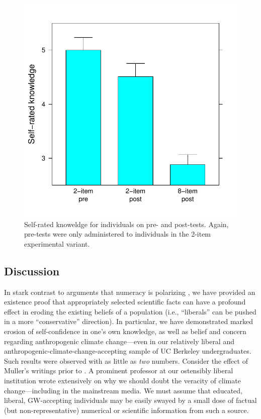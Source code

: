 \begin{figure}
    \centering
    \includegraphics{evil-know.pdf}
    \caption{Self-rated knoweldge for individuals on pre- and post-tests. Again,
        pre-tests were only administered to individuals in the 2-item
        experimental variant.}
    \label{fig:evil-know}
\end{figure}

\subsection{Discussion}

In stark contrast to arguments that numeracy is polarizing
\parencite{kahan_polarizing_2012}, we have provided an existence proof that
appropriately selected scientific facts can have a profound effect in eroding
the existing beliefs of a population (i.e., “liberals” can be pushed in a more
“conservative” direction). In particular, we have demonstrated marked erosion of
self-confidence in one's own knowledge, as well as belief and concern regarding
anthropogenic climate change---even in our relatively liberal and
anthropogenic-climate-change-accepting sample of UC Berkeley undergraduates.
Such results were observed with as little as \emph{two} numbers.
Consider the effect of Muller's writings prior to \textcite{rohde_new_2013}. A
prominent professor at our ostensibly liberal institution wrote extensively on
why we should doubt the veracity of climate change---including in the mainstream
media. We must assume that educated, liberal, GW-accepting individuals may be
easily swayed by a small dose of factual (but non-representative) numerical or
scientific information from such a source.

